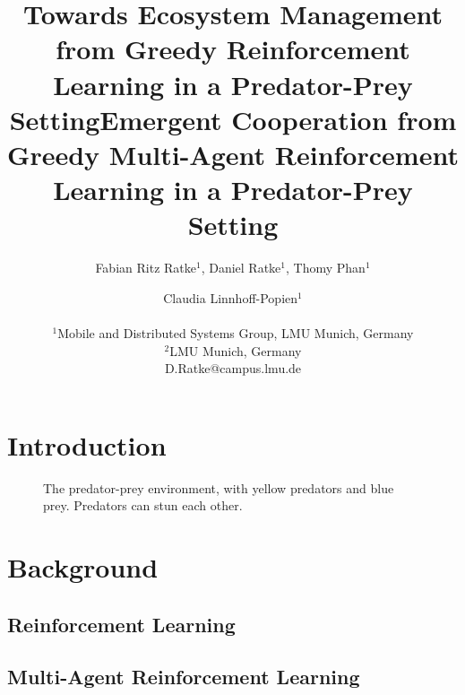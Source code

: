 \documentclass[letterpaper]{article}
\title{Towards Ecosystem Management from Greedy Reinforcement Learning in a Predator-Prey Setting}
\title{Emergent Cooperation from Greedy Multi-Agent Reinforcement Learning in a Predator-Prey Setting}
\author{Fabian Ritz Ratke$^{1}$, Daniel Ratke$^{1}$, Thomy Phan$^1$ \and Claudia Linnhoff-Popien$^1$ \\
\mbox{}\\
$^1$Mobile and Distributed Systems Group, LMU Munich, Germany \\
$^2$LMU Munich, Germany \\
D.Ratke@campus.lmu.de} %
\begin{document}
\maketitle

\begin{abstract}
    \blindtext[2]
\end{abstract}

\section{Introduction}

\blindtext[4]

\begin{figure}%
    \centering
    \caption{The predator-prey environment, with yellow predators and blue prey. Predators can stun each other.}%
    \label{fig:aquarium}%
\end{figure}

\section{Background}

\subsection{Reinforcement Learning}

\blindtext[2]

\subsection{Multi-Agent Reinforcement Learning}
\end{document}
